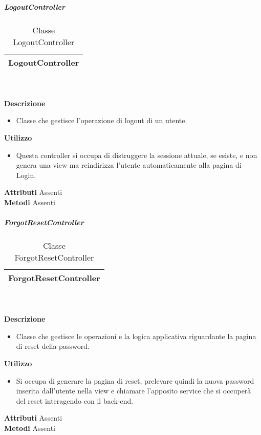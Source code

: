 			\subparagraph{LogoutController} 
\begin{table}[ht]
\begin{center}
\bgroup
	\setlength{\arrayrulewidth}{0.6mm}
	\def\arraystretch{1}
		\begin{tabular}{ | p{12cm} | }
				\hline  
					\centerline{\textbf{LogoutController}}
		\\ \hline 
				\hline
				\hline
		
		\end{tabular}
\egroup
\caption{Classe LogoutController}
\end{center}
\end{table} \textbf{\\ \\ Descrizione}
\begin{itemize}
\item[] Classe che gestisce l'operazione di logout di un utente.
\end{itemize} 
\textbf{Utilizzo}
\begin{itemize}
\item[] Questa controller si occupa di distruggere la sessione attuale, se esiste, e non genera una view ma reindirizza l'utente automaticamente alla pagina di Login.
\end{itemize}
\textbf{Attributi}
Assenti \\
\textbf{Metodi}
Assenti \\

			\subparagraph{ForgotResetController} 
\begin{table}[ht]
\begin{center}
\bgroup
	\setlength{\arrayrulewidth}{0.6mm}
	\def\arraystretch{1}
		\begin{tabular}{ | p{12cm} | }
				\hline  
					\centerline{\textbf{ForgotResetController}}
		\\ \hline 
				\hline
				\hline
		
		\end{tabular}
\egroup
\caption{Classe ForgotResetController}
\end{center}
\end{table} \textbf{\\ \\ Descrizione}
\begin{itemize}
\item[] Classe che gestisce le operazioni e la logica applicativa riguardante la pagina di reset della password.
\end{itemize} 
\textbf{Utilizzo}
\begin{itemize}
\item[] Si occupa di generare la pagina di reset, prelevare quindi la nuova password inserita dall'utente nella view e chiamare l'apposito service che si occuperà del reset interagendo con il back-end.
\end{itemize}
\textbf{Attributi}
Assenti \\
\textbf{Metodi}
Assenti \\

